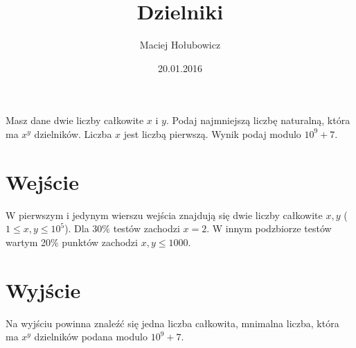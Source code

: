 \documentclass[zad,zawodnik,utf8]{sinol}
\title{Dzielniki}
\author{Maciej Hołubowicz} %
\date{20.01.2016}
\begin{document}
\begin{tasktext}%
Masz dane dwie liczby całkowite $x$ i $y$. Podaj najmniejszą liczbę naturalną, która ma $x^y$ dzielników.\newline
Liczba $x$ jest liczbą pierwszą.\newline \newline
Wynik podaj modulo $10^9+7$.

  \section{Wejście}
W pierwszym i jedynym wierszu wejścia znajdują się dwie liczby całkowite $x, y$ ($1 \leq x, y \leq 10^5$).\newline \newline
Dla 30\% testów zachodzi $x=2$.\newline
W innym podzbiorze testów wartym 20\% punktów zachodzi $x, y \leq 1000$.

  \section{Wyjście}
Na wyjściu powinna znaleźć się jedna liczba całkowita, mnimalna liczba, która ma $x^y$ dzielników podana modulo $10^9+7$.

\makecompactexample

\end{tasktext}
\end{document}
